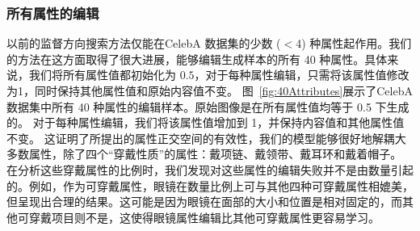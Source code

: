 \subsubsection{所有属性的编辑}
以前的监督方向搜索方法仅能在CelebA 数据集的少数 ($<$4) 种属性起作用。我们的方法在这方面取得了很大进展，能够编辑生成样本的所有 40 种属性。具体来说，我们将所有属性值都初始化为 $0.5$，对于每种属性编辑，只需将该属性值修改为1，同时保持其他属性值和原始内容值不变。 图~\ref{fig:40Attributes}展示了CelebA 数据集中所有 40 种属性的编辑样本。原始图像是在所有属性值均等于 0.5 下生成的。 对于每种属性编辑，我们将该属性值增加到 1，并保持内容值和其他属性值不变。
这证明了所提出的属性正交空间的有效性，我们的模型能够很好地解耦大多数属性，除了四个“穿戴性质”的属性：戴项链、戴领带、戴耳环和戴着帽子。
在分析这些穿戴属性的比例时，我们发现对这些属性的编辑失败并不是由数量引起的。例如，作为可穿戴属性，眼镜在数量比例上可与其他四种可穿戴属性相媲美，但呈现出合理的结果。这可能是因为眼镜在面部的大小和位置是相对固定的，而其他可穿戴项目则不是，这使得眼镜属性编辑比其他可穿戴属性更容易学习。

